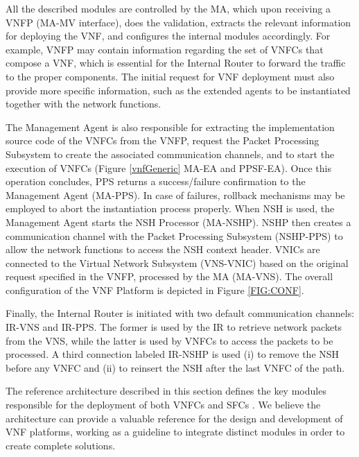 
 All the described modules are controlled by the MA, which upon receiving a VNFP (MA-MV interface), does the validation, extracts the relevant information for deploying the VNF, and configures the internal modules accordingly. For example, VNFP may contain information regarding the set of VNFCs that compose a VNF, which is essential for the Internal Router to forward the traffic to the proper components. The initial request for VNF deployment must also provide more specific information, such as the extended agents to be instantiated together with the network functions.

The Management Agent is also responsible for extracting the implementation source code of the VNFCs from the VNFP, request the Packet Processing Subsystem to create the associated communication channels, and to start the execution of VNFCs (Figure \ref{vnfGeneric} MA-EA and PPSF-EA). Once this operation concludes, PPS returns a success/failure confirmation to the Management Agent (MA-PPS). In case of failures, rollback mechanisms may be employed to abort the instantiation process properly. When NSH is used, the Management Agent starts the NSH Processor (MA-NSHP). NSHP then creates a communication channel with the Packet Processing Subsystem (NSHP-PPS) to allow the network functions to access the NSH context header. VNICs are connected to the Virtual Network Subsystem (VNS-VNIC) based on the original request specified in the VNFP, processed by the MA (MA-VNS). The overall configuration of the VNF Platform is depicted in Figure \ref{FIG:CONF}.


Finally, the Internal Router is initiated with two default communication channels: IR-VNS and IR-PPS. The former is used by the IR to retrieve network packets from the VNS, while the latter is used by VNFCs to access the packets to be processed. A third connection labeled IR-NSHP is used (i) to remove the NSH before any VNFC and (ii) to reinsert the NSH after the last VNFC of the path.

The reference architecture described in this section defines the key modules responsible for the deployment of both VNFCs and SFCs \cite{Joel-2015}. We believe the architecture can provide a valuable reference for the design and development of VNF platforms, working as a guideline to integrate distinct modules in order to create complete solutions.

